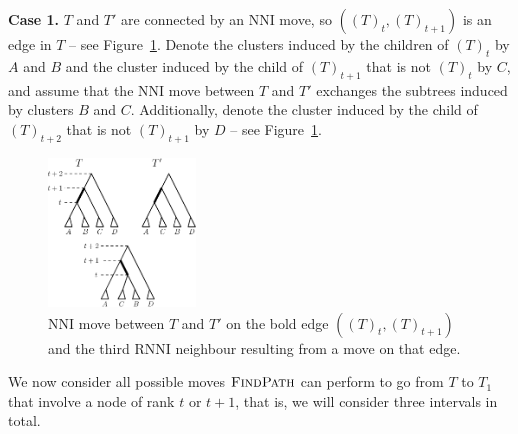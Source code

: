 \documentclass[11pt]{amsart}
\newcommand{\rnni}{\mathrm{RNNI}}
\newcommand{\findpath}{\textsc{FindPath}}
\newcommand{\nni}{\mathrm{NNI}}
\begin{document}
\textbf{Case 1.}
$T$ and $T'$ are connected by an $\nni$ move, so $((T)_t,(T)_{t+1})$ is an edge in $T$ -- see Figure~\ref{fig:thm_fp_nni1}.
Denote the clusters induced by the children of $(T)_t$ by $A$ and $B$ and the cluster induced by the child of $(T)_{t+1}$ that is not $(T)_t$ by $C$, and assume that the $\nni$ move between $T$ and $T'$ exchanges the subtrees induced by clusters $B$ and $C$.
Additionally, denote the cluster induced by the child of $(T)_{t+2}$ that is not $(T)_{t+1}$ by $D$ -- see Figure~\ref{fig:thm_fp_nni1}.

\begin{figure}[ht]
\centering
\includegraphics[width=0.35\textwidth]{thm_fp_nni1}
\caption{$\nni$ move between $T$ and $T'$ on the bold edge $((T)_t,(T)_{t+1})$ and the third $\rnni$ neighbour resulting from a move on that edge.}
\label{fig:thm_fp_nni1}
\end{figure}

We now consider all possible moves $\findpath$ can perform to go from $T$ to $T_1$ that involve a node of rank $t$ or $t+1$, that is, we will consider three intervals in total.
\end{document}
